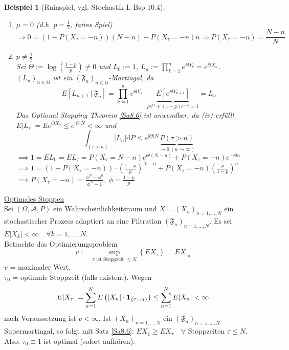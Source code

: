 \documentclass[a4paper,11pt]{book}
\newcommand{\N}{{\mathbb N}}
\newcommand{\ind}{\text{\bf{1}}}
\def\AA{ \mathcal{A} }
\def\FF{ \mathfrak{F} }
\def\folgt{\ensuremath{\implies}}
\def\d{\mbox{d}}
\newtheorem{Bsp}{Beispiel}[chapter]
\theoremstyle{nonumberplain}
\begin{document}
\begin{Bsp}[Ruinspiel, vgl. Stochastik I, Bsp 10.4]
\begin{enumerate}
\item[Fall 1:] $\mu = 0$ (d.h. $p = \frac12$, faires Spiel)
\[
\Rightarrow 0 = (1-P(X_{\tau} = -n))(N-n) - P(X_{\tau} = -n)n \Rightarrow P(X_{\tau} = -n) = \frac{N-n}{N}
\]

\item[Fall 2:] $p \neq \frac12$ \\
Sei $\Theta := \log(\frac{1-p}{p}) \neq 0$ und $L_0 := 1$, $L_n := \prod_{k=1}^n e^{\Theta Y_k} = e^{\Theta X_n}$. \\
$(L_n)_{n\in\N}$ ist ein $(\FF_n)_{n\in\N}$-Martingal, da
$$E\left[L_{n+1}\ |\ \FF_n\right] = \prod_{k=1}^n e^{\Theta Y_k} \cdot \underbrace{E\left[ e^{\Theta Y_{n+1}} \right]}_{pe^{\Theta} + (1-p)e^{-\Theta} = 1} = L_n$$
Das Optional Stopping Theorem \ref{Sa8.6} ist anwendbar, da (iv) erfüllt \\
$E|L_{\tau}| = Ee^{\Theta X_{\tau}} \leq e^{|\Theta|N} < \infty$ und
$$\int_{\left\{ \tau > n \right\}} |L_n| \d P \leq e^{|\Theta|N} \underbrace{P\left( \tau > n \right)}_{\to 0\ (n\to\infty)}$$
$\folgt 1 = EL_0 = EL_{\tau} = P(X_{\tau} = N-n)e^{\Theta(N-n)} + P(X_{\tau} = -n)e^{-\Theta n}$ \\
$\folgt 1 = (1 - P(X_{\tau} = -n))\cdot(\frac{1-p}{p})^{N-n} + P(X_{\tau} = -n)(\frac{p}{1-p})^n$ \\
$\folgt P(X_{\tau} = -n) = \frac{\phi^N - \phi^n}{\phi^N - 1},\ \phi = \frac{1-p}{p}$
\end{enumerate}
\end{Bsp}

\underline{Optimales Stoppen} \\
Sei $(\Omega,\AA,P)$ ein Wahrscheinlichkeitsraum und $X = (X_n)_{n=1,\dots,N}$ ein stochastischer Prozess adaptiert an eine Filtration $(\FF_n)_{n=1,\dots,N}$. Es sei $E|X_k| < \infty \quad\forall k=1,\dots,N$. \\
Betrachte das Optimierungsproblem
$$v := \sup_{\tau\text{ ist Stoppzeit }\leq N} \left\{ EX_{\tau} \right\} = EX_{\tau_0}$$
$v$ = maximaler Wert, \\
$\tau_0$ = optimale Stoppzeit (falls existent). Wegen
$$E|X_{\tau}| = \sum_{n=1}^N E\left( |X_n|\cdot\ind_{\left\{ \tau = n \right\}} \right) \leq \sum_{n=1}^N E|X_n| < \infty$$
nach Voraussetzung ist $v < \infty$. Ist $(X_n)_{n=1,\dots,N}$ ein $(\FF_n)_{n=1,\dots,N}$ Supermartingal, so folgt mit Satz \ref{Sa8.6}: $EX_1 \geq EX_{\tau} \quad\forall$ Stoppzeiten $\tau \leq N$. \\
Also: $\tau_0 \equiv 1$ ist optimal (sofort aufhören).
\end{document}
